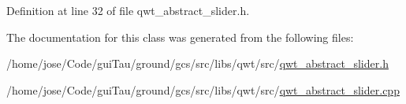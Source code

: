 Definition at line 32 of file qwt\-\_\-abstract\-\_\-slider.\-h.



The documentation for this class was generated from the following files\-:\begin{DoxyCompactItemize}
\item 
/home/jose/\-Code/gui\-Tau/ground/gcs/src/libs/qwt/src/\hyperlink{qwt__abstract__slider_8h}{qwt\-\_\-abstract\-\_\-slider.\-h}\item 
/home/jose/\-Code/gui\-Tau/ground/gcs/src/libs/qwt/src/\hyperlink{qwt__abstract__slider_8cpp}{qwt\-\_\-abstract\-\_\-slider.\-cpp}\end{DoxyCompactItemize}
